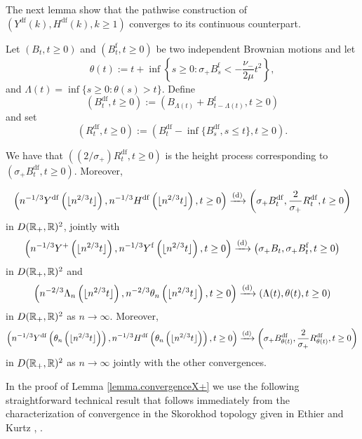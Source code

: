 The next lemma show that the pathwise construction of $(Y^{\mathrm{df}}(k),H^{\mathrm{df}}(k),k\geq 1)$ converges to its continuous counterpart.

Let $(B_t, t \geq 0)$ and $(B^{\mathrm{f}}_t, t\geq 0)$ be two independent Brownian motions and let $$\theta(t):=t+\inf\left\{s\geq 0 : \sigma_+ B^{\mathrm{f}}_s< -\frac{\nu_-}{2\mu} t^2\right\},$$ and $\Lambda(t)=\inf\{s\geq 0:\theta(s)> t\}$. Define \begin{equation}\label{eq.definitionBpr}\left(B^{\mathrm{df}}_t,t \geq 0\right):=\left( B_{\Lambda(t)}+ B^{\mathrm{f}}_{t-\Lambda(t)}, t\geq 0\right)\end{equation}
and set
$$(R^{\mathrm{df}}_t, t\geq 0):=\left(B^{\mathrm{df}}_t-\inf\{B^{\mathrm{df}}_s,s\leq t\},t\geq 0\right).$$ 

\begin{lemma}\label{lemma.convergenceX+}
We have that $\left((2/\sigma_+)R^{\mathrm{df}}_t, t\geq 0\right)$
is the height process corresponding to $\left(\sigma_+ B^{\mathrm{df}}_t,t \geq 0\right)$.
Moreover,

\begin{equation}\label{eq.convergenceYpr} \left(n^{-1/3}Y^{\mathrm{df}}\left( \lfloor n^{2/3}t \rfloor \right), n^{-1/3}H^{\mathrm{df}}\left( \lfloor n^{2/3}t \rfloor \right),t\geq 0\right)\xrightarrow[]{\mathrm{(d)}}\left( \sigma_+ B^{\mathrm{df}}_{t} ,\frac{2}{\sigma_+}R^{\mathrm{df}}_t, t\geq 0\right)\end{equation}
in $D({\mathbb R}_+,{\mathbb R})^2$, jointly with 
$$\left(n^{-1/3}Y^+\left(\lfloor n^{2/3}t \rfloor \right), n^{-1/3}Y^{\mathrm{f}}\left(\lfloor n^{2/3}t \rfloor \right), t\geq 0\right) \xrightarrow[]{\mathrm{(d)}}\left(\sigma_+ B_t,\sigma_+ B^{\mathrm{f}}_t, t\geq 0\right)$$
in $D({\mathbb R}_+,{\mathbb R})^2$ and 
$$\left(n^{-2/3} \Lambda_n\left(\lfloor n^{2/3}t\rfloor \right), n^{-2/3}\theta_n\left(\lfloor n^{2/3}t\rfloor \right),t\geq 0\right)\xrightarrow[]{\mathrm{(d)}}\left(\Lambda(t),\theta(t), t\geq 0 \right)$$
in $D({\mathbb R}_+,{\mathbb R})^2$ as $n\to \infty$. 
Moreover,   
\begin{equation}\label{eq.convergencecompSprandtheta}\left(n^{-1/3}Y^{\mathrm{df}}\left(\theta_n \left(\lfloor n^{2/3}t\rfloor \right)\right), n^{-1/3}H^{\mathrm{df}}\left(\theta_n\left(\lfloor n^{2/3}t\rfloor \right) \right),t\geq 0 \right) \xrightarrow[]{\mathrm{(d)}} \left(\sigma_+ B^{\mathrm{df}}_{\theta(t)}, \frac{2}{\sigma_+}R^{\mathrm{df}}_{\theta(t)},t\geq 0\right)\end{equation}
in $D({\mathbb R}_+,{\mathbb R})^2$ as $n\to \infty$ jointly with the other convergences.
\end{lemma}
In the proof of Lemma \ref{lemma.convergenceX+} we use the following straightforward technical result that follows immediately from the characterization of convergence in the Skorokhod topology given in Ethier and Kurtz \cite[Proposition 3.6.5]{ethierMarkovProcessesCharacterization1986}, .

